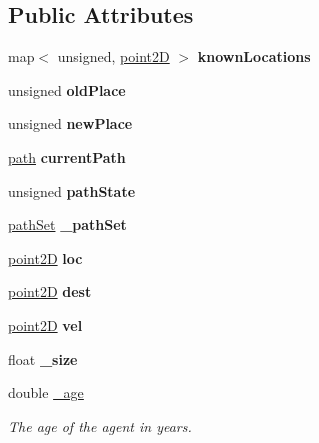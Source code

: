 \subsection*{Public Attributes}
\begin{DoxyCompactItemize}
\item 
\mbox{\label{classagent_a3b5f19fe489aeaa4a44365b80a20de50}} 
map$<$ unsigned, \mbox{\hyperlink{classpoint2D}{point2D}} $>$ {\bfseries known\+Locations}
\item 
\mbox{\label{classagent_adb1d1bc0cee97d9c4d3c68536e84f3f6}} 
unsigned {\bfseries old\+Place}
\item 
\mbox{\label{classagent_a14bacf305626b17d29eef5681f284f7a}} 
unsigned {\bfseries new\+Place}
\item 
\mbox{\label{classagent_ad7fc52cb970a53fb03f3a08f6e00c4de}} 
\mbox{\hyperlink{structpath}{path}} {\bfseries current\+Path}
\item 
\mbox{\label{classagent_ac297c591823cd9c23c8cdbcaea964344}} 
unsigned {\bfseries path\+State}
\item 
\mbox{\label{classagent_a51641f914b14e5c5be4fd6ea7a6f50f3}} 
\mbox{\hyperlink{structpathSet}{path\+Set}} {\bfseries \+\_\+path\+Set}
\item 
\mbox{\label{classagent_a625057d4c53fe2581f1c963d4da601ba}} 
\mbox{\hyperlink{classpoint2D}{point2D}} {\bfseries loc}
\item 
\mbox{\label{classagent_a1cf261bbb26132bbc68c0a7d920437f4}} 
\mbox{\hyperlink{classpoint2D}{point2D}} {\bfseries dest}
\item 
\mbox{\label{classagent_a5ff902fc713259415266ca26f2bb8ecb}} 
\mbox{\hyperlink{classpoint2D}{point2D}} {\bfseries vel}
\item 
\mbox{\label{classagent_aa029a96be166646fb046873a73d3fbdd}} 
float {\bfseries \+\_\+size}
\item 
double \mbox{\hyperlink{classagent_a9c76eb9369864fb60a2d5a4f44c56843}{\+\_\+age}}
\begin{DoxyCompactList}\small\item\em The age of the agent in years. \end{DoxyCompactList}\item 

\end{DoxyCompactItemize}
